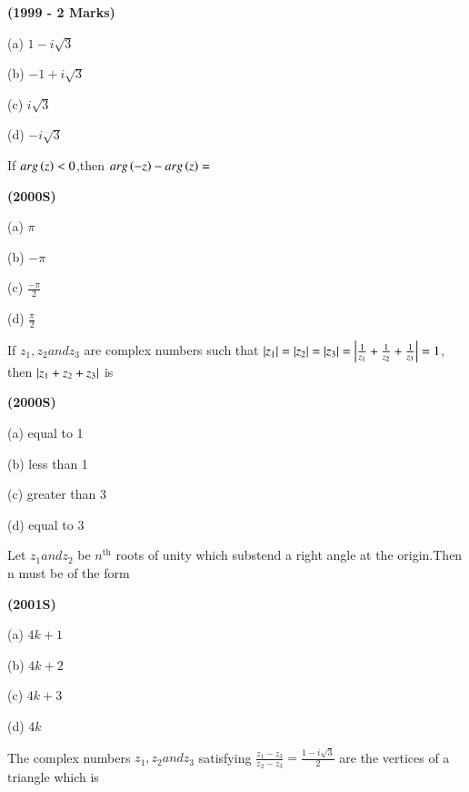 \documentclass[journal,12pt,twocolumn]{IEEEtran}
\theoremstyle{remark}
\begin{document}
\hfill{\textbf{(1999 - 2 Marks)}}

\begin{enumerate}
\begin{multicols}{4}
\item[(a)]$1-i\sqrt{3}$
\item[(b)]$-1+i\sqrt{3}$
\item[(c)]$i\sqrt{3}$
\item[(d)]$-i\sqrt{3}$
\end{multicols}
\end{enumerate}
\item If $arg\left(z\right)<0$,then $arg\left(-z\right)-arg\left(z\right)=$

\hfill{\textbf{(2000S)}}

\begin{enumerate}
\begin{multicols}{4}
\item[(a)]$\pi$
\item[(b)]$-\pi$
\item[(c)]$\frac{-\pi}{2}$
\item[(d)]$\frac{\pi}{2}$
\end{multicols}
\end{enumerate}
\item If $z_1,z_2 and z_3$ are complex numbers such that $\left\vert z_1\right\vert=\left\vert z_2\right\vert=\left\vert z_3\right\vert=\left\vert\frac{1}{z_1}+\frac{1}{z_2}+\frac{1}{z_3}\right\vert=1$, then $\left\vert z_1+z_2+z_3\right\vert$ is 

\hfill{\textbf{(2000S)}}

\begin{enumerate}
\begin{multicols}{2}
\item[(a)]equal to 1
\item[(b)]less than 1
\item[(c)]greater than 3
\item[(d)]equal to 3
\end{multicols}
\end{enumerate}
\item Let $z_1 and z_2$ be $n^{\text{th}}$ roots of unity which substend a right angle at the origin.Then n must be of the form

\hfill{\textbf{(2001S)}}

\begin{enumerate}
\begin{multicols}{4}
\item[(a)]$4k+1$
\item[(b)]$4k+2$
\item[(c)]$4k+3$
\item[(d)]$4k$
\end{multicols}
\end{enumerate}
\item The complex numbers $z_1,z_2 and z_3$ satisfying $\frac{z_1-z_3}{z_2-z_3}=\frac{1-i\sqrt{3}}{2}$ are the vertices of a triangle which is
\end{document}
